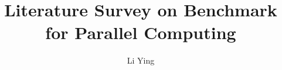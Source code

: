 \documentclass[a4paper,11pt]{article}
\author{Li Ying}
\title{Literature Survey on Benchmark for Parallel Computing}
\begin{document}
\maketitle

\nocite{*}


\end{document}
